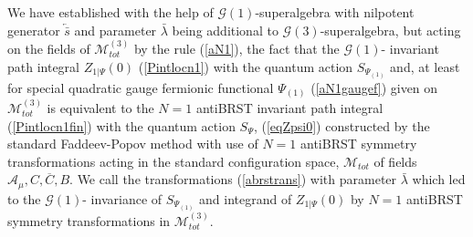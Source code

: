 \documentclass[10pt]{article}
\begin{document}
We have established with the help of   $\mathcal{G}(1)$-superalgebra with nilpotent generator $\overleftarrow{\bar{s}}$ and parameter $\bar{\lambda}$ being additional  to $\mathcal{G}(3)$-superalgebra, but acting on  the fields of $\mathcal{M}^{(3)}_{tot}$ by the rule (\ref{aN1}), the fact that  the $\mathcal{G}(1)$- invariant path integral ${Z}_{1|\Psi}(0)$ (\ref{Pintlocn1}) with the quantum action $S_{\Psi_{(1)}}$  and, at least for special quadratic  gauge fermionic functional $\Psi_{(1)} $ (\ref{aN1gaugef})  given on $\mathcal{M}^{(3)}_{tot}$ is equivalent to the $N=1$ antiBRST invariant  path integral (\ref{Pintlocn1fin}) with the quantum action $S_{\Psi}$, (\ref{eqZpsi0}) constructed by the standard Faddeev-Popov method  with use of $N=1$ antiBRST symmetry transformations acting in the standard  configuration space, $\mathcal{M}_{tot}$  of fields $\mathcal{A}_\mu, C, \overline{C}, B$. We call the transformations  (\ref{abrstrans}) with parameter  $\bar{\lambda}$ which led to the $\mathcal{G}(1)$- invariance of  $S_{\Psi_{(1)}}$ and integrand of ${Z}_{1|\Psi}(0)$ by $N=1$ antiBRST symmetry transformations in  $\mathcal{M}^{(3)}_{tot}$.
\end{document}
